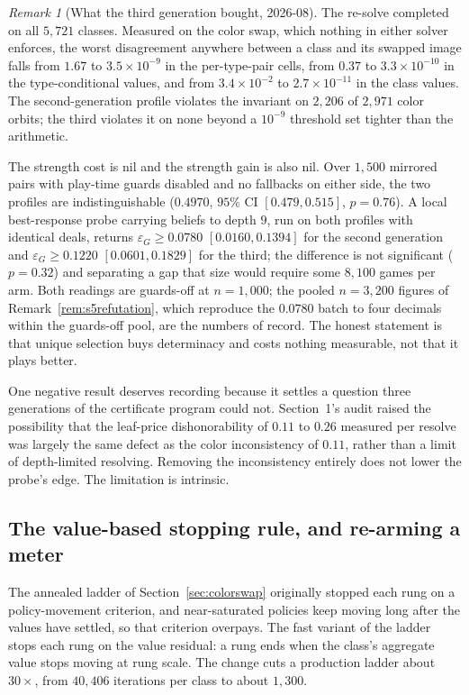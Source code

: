 \documentclass[11pt]{article}
\theoremstyle{plain}
\theoremstyle{definition}
\theoremstyle{remark}
\newtheorem{remark}[theorem]{Remark}
\newcommand{\game}{\ensuremath{G}}
\newcommand{\epsG}{\ensuremath{\varepsilon_{\game}}}
\begin{document}
\begin{remark}[What the third generation bought, 2026-08]
The re-solve completed on all $5{,}721$ classes. Measured on the
color swap, which nothing in either solver enforces, the worst
disagreement anywhere between a class and its swapped image falls from
$1.67$ to $3.5\times10^{-9}$ in the per-type-pair cells, from $0.37$ to
$3.3\times10^{-10}$ in the type-conditional values, and from
$3.4\times10^{-2}$ to $2.7\times10^{-11}$ in the class values. The
second-generation profile violates the invariant on $2{,}206$ of
$2{,}971$ color orbits; the third violates it on none beyond a
$10^{-9}$ threshold set tighter than the arithmetic.

The strength cost is nil and the strength gain is also nil. Over
$1{,}500$ mirrored pairs with play-time guards disabled and no
fallbacks on either side, the two profiles are indistinguishable
($0.4970$, $95\%$ CI $[0.479, 0.515]$, $p = 0.76$). A local
best-response probe carrying beliefs to depth $9$, run on both
profiles with identical deals, returns $\epsG \ge 0.0780$
$[0.0160, 0.1394]$ for the second generation and $\epsG \ge 0.1220$
$[0.0601, 0.1829]$ for the third; the difference is not significant
($p = 0.32$) and separating a gap that size would require some
$8{,}100$ games per arm. Both readings are guards-off at
$n=1{,}000$; the pooled $n=3{,}200$ figures of
Remark~\ref{rem:s5refutation}, which reproduce the $0.0780$ batch to
four decimals within the guards-off pool, are the numbers of record.
The honest statement is that unique selection
buys determinacy and costs nothing measurable, not that it plays
better.

One negative result deserves recording because it settles a question
three generations of the certificate program could not. Section~1's
audit raised the possibility that the leaf-price dishonorability of
$0.11$ to $0.26$ measured per resolve was largely the same defect as
the color inconsistency of $0.11$, rather than a limit of
depth-limited resolving. Removing the inconsistency entirely does not
lower the probe's edge. The limitation is intrinsic.
\end{remark}

\subsection{The value-based stopping rule, and re-arming a meter}
\label{sec:stoprule}

The annealed ladder of Section~\ref{sec:colorswap} originally
stopped each rung on a policy-movement criterion, and
near-saturated policies keep moving long after the values have
settled, so that criterion overpays. The fast variant of the ladder
stops each rung on the value residual: a rung ends when the
class's aggregate value stops moving at rung scale. The change cuts a
production ladder about $30\times$, from $40{,}406$ iterations per
class to about $1{,}300$.
\end{document}
